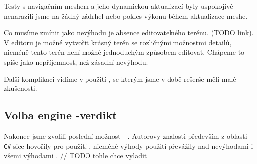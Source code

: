 Testy s navigačním meshem a jeho dynamickou aktualizací byly uspokojivé - nenarazili jsme na žádný zádrhel nebo pokles výkonu během aktualizace meshe. 

Co musíme zmínit jako nevýhodu je absence editovatelného terénu. (TODO link). V editoru je možné vytvořit krásný terén se rozličnými možnostmi detailů, nicméně tento terén není možné jednoduchým způsobem editovat. Chápeme to spíše jako nepříjemnost, než zásadní nevýhodu. 

Další komplikaci vidíme v použití \CPP{}, se kterým jsme v době rešerše měli malé zkušenosti.




\subsection{Volba engine -verdikt}


Nakonec jsme zvolili poslední možnost - \UE{}. Autorovy znalosti především z oblasti \texttt{C\#} sice hovořily pro použití \UN{}, nicméně výhody použití \UE{} převážily nad nevýhodami i všemi výhodami \UN{}.	// TODO tohle chce vyladit